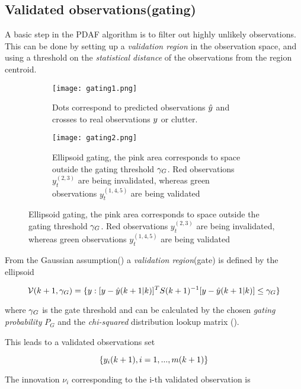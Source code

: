 \subsection{Validated observations(gating)}

A basic step in the PDAF algorithm is to filter out highly unlikely observations. This can be done by setting up a \emph{validation region} in the observation space, and using a threshold on the \emph{statistical distance} of the observations from the region centroid.


\begin{figure}[H]
	\begin{subfigure}{.5\textwidth}
		\centering
		\texttt{[image: gating1.png]}
		\caption{Dots correspond to predicted observations ${\hat{{y}}}$ and  crosses to real observations ${y}$ or clutter.}
		\label{fig:gating1}
	\end{subfigure}
	\begin{subfigure}{.5\textwidth}
			\centering
			\texttt{[image: gating2.png]}
			\caption{Ellipsoid gating, the pink area corresponds to space outside the gating threshold ${\gamma_G}$. Red observations $y_t^{(2,3)}$ are being invalidated, whereas green observations $y_t^{(1,4,5)}$ are being validated}
			\label{fig:gating2}
	\end{subfigure}
	\label{fig:fig}
\end{figure}




From the Gaussian assumption() a \emph{validation region}(gate) is defined by the ellipsoid

\begin{equation}\label{eq:validationGate}
\mathcal{V}(k+1, {\gamma_G}) = \{{y}: [{y}-{\hat{{y}}}(k+1|k)]^T S(k+1)^{-1} [{y}-{\hat{{y}}}(k+1|k)] \leq {\gamma_G} \}
\end{equation}



where ${\gamma_G}$ is the gate threshold and can be calculated by the chosen \emph{gating probability }$P_G$ and the \emph{chi-squared} distribution lookup matrix ().


This leads to a validated observations set

$$
\{{y}_i(k+1), i = 1, ..., m(k+1)\}
$$


The innovation $\nu_i$ corresponding to the i-th validated observation is

